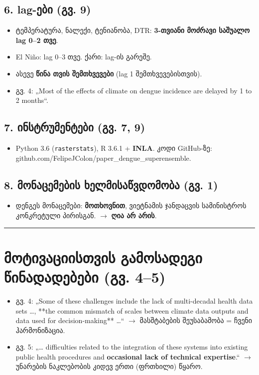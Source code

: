 \documentclass[11pt,a4paper]{article}
\begin{document}
\subsection*{6. lag-ები (გვ. 9)}
\begin{itemize}[nosep]
\item ტემპერატურა, ნალექი, ტენიანობა, DTR: \textbf{3-თვიანი მოძრავი საშუალო lag 0–2 თვე}.
\item El Niño: lag 0–3 თვე. ქარი: lag-ის გარეშე.
\item ასევე \textbf{წინა თვის შემთხვევები} (lag 1 შემთხვევებისთვის).
\item გვ. 4: „Most of the effects of climate on dengue incidence are delayed by 1 to 2 months“.
\end{itemize}

\subsection*{7. ინსტრუმენტები (გვ. 7, 9)}
\begin{itemize}[nosep]
\item Python 3.6 (\texttt{rasterstats}), R 3.6.1 + \textbf{INLA}. კოდი GitHub-ზე: github.com/FelipeJColon/paper\_dengue\_superensemble.
\end{itemize}

\subsection*{8. მონაცემების ხელმისაწვდომობა (გვ. 1)}
\begin{itemize}[nosep]
\item დენგეს მონაცემები: \textbf{მოთხოვნით}, ვიეტნამის ჯანდაცვის სამინისტროს კონკრეტული პირისგან. $\rightarrow$ \textbf{ღია არ არის}.
\end{itemize}

\medskip\hrule\medskip

\section*{მოტივაციისთვის გამოსადეგი წინადადებები (გვ. 4–5)}
\begin{itemize}[nosep]
\item გვ. 4: „Some of these challenges include the lack of multi-decadal health data sets …, **the common mismatch of
scales between climate data outputs and data used for decision-making** …“ $\rightarrow$ მასშტაბების შეუსაბამობა = ჩვენი
ჰარმონიზაცია.
\item გვ. 5: „… difficulties related to the integration of these systems into existing public health procedures and
\textbf{occasional lack of technical expertise}.“ $\rightarrow$ უნარების ნაკლებობის კიდევ ერთი (ფრთხილი) წყარო.
\end{itemize}
\end{document}
